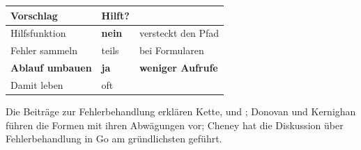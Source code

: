 \begin{aufgabe}
\begin{warnung}
\begin{center}
\renewcommand{\arraystretch}{1.5}
\begin{tabular}{@{}P{3.0cm}P{2.2cm}P{2.8cm}@{}}
\toprule
\textbf{Vorschlag} & \textbf{Hilft?} & \\
\midrule
Hilfsfunktion  & \textcolor{akzent}{\textbf{nein}} & \textcolor{akzent}{versteckt den Pfad}\\
Fehler sammeln & \textcolor{mittel}{teils} & bei Formularen\\
\textbf{Ablauf umbauen} & \textcolor{gruen}{\textbf{ja}} & \textbf{weniger Aufrufe}\\
Damit leben & \textcolor{gruen}{oft} & \\
\bottomrule
\end{tabular}
\end{center}

\begin{center}
\begin{minipage}{0.88\textwidth}
\end{minipage}
\end{center}

\begin{center}
\end{center}
\end{warnung}
\end{aufgabe}
\vspace{-4pt}
\noindent Die Beiträge zur Fehlerbehandlung erklären Kette,  und ; Donovan und Kernighan führen die Formen mit ihren Abwägungen vor; Cheney hat die Diskussion über Fehlerbehandlung in Go am gründlichsten geführt.
